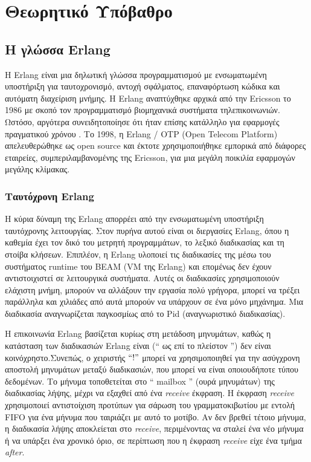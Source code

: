 \chapter{Θεωρητικό Υπόβαθρο}
\label{sec:background}

\section{Η γλώσσα Erlang}

Η Erlang είναι μια δηλωτική γλώσσα προγραμματισμού με ενσωματωμένη υποστήριξη για ταυτοχρονισμό,
αντοχή σφάλματος, επαναφόρτωση κώδικα και αυτόματη διαχείριση μνήμης.
Η Erlang αναπτύχθηκε αρχικά από την Ericsson το 1986 με σκοπό τον προγραμματισμό
βιομηχανικά συστήματα τηλεπικοινωνιών. Ωστόσο, αργότερα συνειδητοποίησε ότι
ήταν επίσης κατάλληλο για εφαρμογές πραγματικού χρόνου \cite{Armstrong:1996:CPE:229883}.
Το 1998, η Erlang / OTP (Open Telecom Platform) απελευθερώθηκε ως open source και έκτοτε χρησιμοποιήθηκε
εμπορικά από διάφορες εταιρείες, συμπεριλαμβανομένης της Ericsson, για μια μεγάλη ποικιλία εφαρμογών μεγάλης κλίμακας.

\subsection{Ταυτόχρονη Erlang}

Η κύρια δύναμη της Erlang απορρέει από την ενσωματωμένη υποστήριξη ταυτόχρονης λειτουργίας. Στον πυρήνα αυτού
είναι οι διεργασίες Erlang, όπου η καθεμία έχει τον δικό του μετρητή προγραμμάτων, το λεξικό διαδικασίας και τη στοίβα κλήσεων.
Επιπλέον, η Erlang υλοποιεί τις διαδικασίες της μέσω του συστήματος runtime του BEAM (VM της Erlang)
και επομένως δεν έχουν αντιστοιχιστεί σε λειτουργικά συστήματα. Αυτές οι διαδικασίες χρησιμοποιούν ελάχιστη μνήμη, μπορούν να αλλάξουν την εργασία πολύ γρήγορα,
μπορεί να τρέξει παράλληλα και χιλιάδες από αυτά μπορούν να υπάρχουν σε ένα μόνο μηχάνημα.
Μια διαδικασία αναγνωρίζεται παγκοσμίως από το Pid (αναγνωριστικό διαδικασίας).

Η επικοινωνία Erlang βασίζεται κυρίως στη μετάδοση μηνυμάτων, καθώς η κατάσταση των διαδικασιών Erlang είναι
(`` ως επί το πλείστον '') δεν είναι κοινόχρηστο.Συνεπώς, ο χειριστής $``!"$ μπορεί να χρησιμοποιηθεί για την ασύγχρονη αποστολή μηνυμάτων μεταξύ διαδικασιών,
που μπορεί να είναι οποιουδήποτε τύπου δεδομένων. Το μήνυμα τοποθετείται στο `` mailbox '' (ουρά μηνυμάτων) της διαδικασίας λήψης,
μέχρι να εξαχθεί από ένα \textit{receive}
έκφραση. Η έκφραση \textit{receive} χρησιμοποιεί αντιστοίχιση προτύπων για σάρωση του γραμματοκιβωτίου με εντολή FIFO
για ένα μήνυμα που ταιριάζει με αυτό το μοτίβο. Αν δεν βρεθεί τέτοιο μήνυμα, η διαδικασία λήψης αποκλείεται στο \textit{receive},
περιμένοντας να σταλεί ένα νέο μήνυμα ή να υπάρξει ένα χρονικό όριο, σε περίπτωση που η έκφραση \textit{receive} είχε ένα τμήμα \textit{after}.


